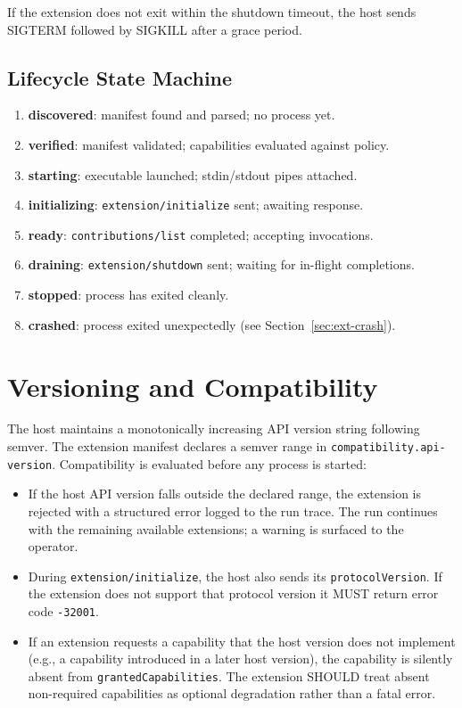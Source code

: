 If the extension does not exit within the shutdown timeout, the host sends
SIGTERM followed by SIGKILL after a grace period.

\subsection{Lifecycle State Machine}

\begin{enumerate}
  \item \textbf{discovered}: manifest found and parsed; no process yet.
  \item \textbf{verified}: manifest validated; capabilities evaluated against
        policy.
  \item \textbf{starting}: executable launched; stdin/stdout pipes attached.
  \item \textbf{initializing}: \texttt{extension/initialize} sent; awaiting
        response.
  \item \textbf{ready}: \texttt{contributions/list} completed; accepting
        invocations.
  \item \textbf{draining}: \texttt{extension/shutdown} sent; waiting for
        in-flight completions.
  \item \textbf{stopped}: process has exited cleanly.
  \item \textbf{crashed}: process exited unexpectedly (see
        Section~\ref{sec:ext-crash}).
\end{enumerate}

\section{Versioning and Compatibility}
\label{sec:ext-versioning}

The host maintains a monotonically increasing API version string following
semver.  The extension manifest declares a semver range in
\texttt{compatibility.api-version}.  Compatibility is evaluated before any
process is started:

\begin{itemize}
  \item If the host API version falls outside the declared range, the extension
        is rejected with a structured error logged to the run trace.  The run
        continues with the remaining available extensions; a warning is surfaced
        to the operator.
  \item During \texttt{extension/initialize}, the host also sends its
        \texttt{protocolVersion}.  If the extension does not support that
        protocol version it MUST return error code \texttt{-32001}.
  \item If an extension requests a capability that the host version does not
        implement (e.g., a capability introduced in a later host version), the
        capability is silently absent from \texttt{grantedCapabilities}.  The
        extension SHOULD treat absent non-required capabilities as optional
        degradation rather than a fatal error.
\end{itemize}

